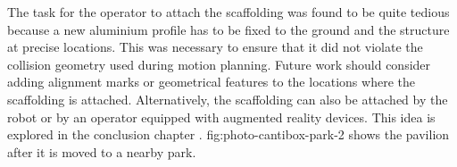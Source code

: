The task for the operator to attach the scaffolding was found to be quite tedious because a new aluminium profile has to be fixed to the ground and the structure at precise locations. This was necessary to ensure that it did not violate the collision geometry used during motion planning. Future work should consider adding alignment marks or geometrical features to the locations where the scaffolding is attached. Alternatively, the scaffolding can also be attached by the robot or by an operator equipped with augmented reality devices. This idea is explored in the conclusion chapter . {fig:photo-cantibox-park-2} shows the pavilion after it is moved to a nearby park.

